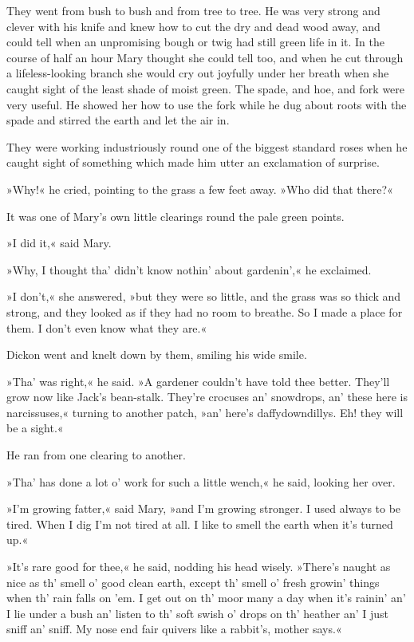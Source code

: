 They went from bush to bush and from tree to tree. He was very strong and clever with his knife and knew how to cut the dry and dead wood away, and could tell when an unpromising bough or twig had still green life in it. In the course of half an hour Mary thought she could tell too, and when he cut through a lifeless-looking branch she would cry out joyfully under her breath when she caught sight of the least shade of moist green. The spade, and hoe, and fork were very useful. He showed her how to use the fork while he dug about roots with the spade and stirred the earth and let the air in.

They were working industriously round one of the biggest standard roses when he caught sight of something which made him utter an exclamation of surprise.

»Why!« he cried, pointing to the grass a few feet away. »Who did that there?«

It was one of Mary's own little clearings round the pale green points.

»I did it,« said Mary.

»Why, I thought tha' didn't know nothin' about gardenin',« he exclaimed.

»I don't,« she answered, »but they were so little, and the grass was so thick and strong, and they looked as if they had no room to breathe. So I made a place for them. I don't even know what they are.«

Dickon went and knelt down by them, smiling his wide smile.

»Tha' was right,« he said. »A gardener couldn't have told thee better. They'll grow now like Jack's bean-stalk. They're crocuses an' snowdrops, an' these here is narcissuses,« turning to another patch, »an' here's daffydowndillys. Eh! they will be a sight.«

He ran from one clearing to another.

»Tha' has done a lot o' work for such a little wench,« he said, looking her over.

»I'm growing fatter,« said Mary, »and I'm growing stronger. I used always to be tired. When I dig I'm not tired at all. I like to smell the earth when it's turned up.«

»It's rare good for thee,« he said, nodding his head wisely. »There's naught as nice as th' smell o' good clean earth, except th' smell o' fresh growin' things when th' rain falls on 'em. I get out on th' moor many a day when it's rainin' an' I lie under a bush an' listen to th' soft swish o' drops on th' heather an' I just sniff an' sniff. My nose end fair quivers like a rabbit's, mother says.«

